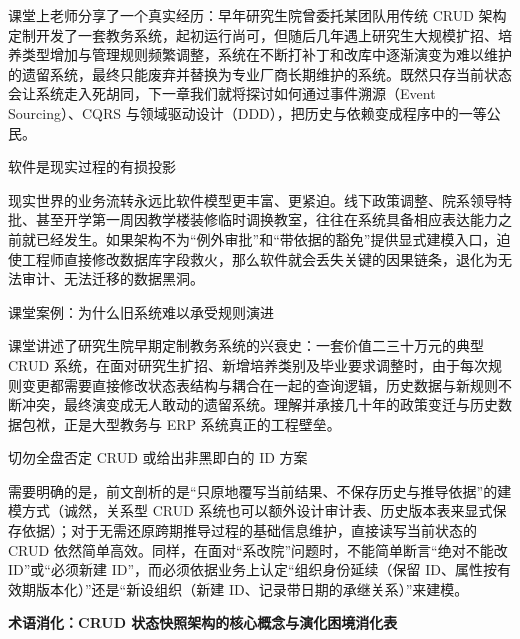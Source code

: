 \documentclass[UTF8,a4paper,11pt,fontset=fandol]{ctexart}
\begin{document}
课堂上老师分享了一个真实经历：早年研究生院曾委托某团队用传统 CRUD 架构定制开发了一套教务系统，起初运行尚可，但随后几年遇上研究生大规模扩招、培养类型增加与管理规则频繁调整，系统在不断打补丁和改库中逐渐演变为难以维护的遗留系统，最终只能废弃并替换为专业厂商长期维护的系统。既然只存当前状态会让系统走入死胡同，下一章我们就将探讨如何通过事件溯源（Event Sourcing）、CQRS 与领域驱动设计（DDD），把历史与依赖变成程序中的一等公民。

\begin{importantbox}{软件是现实过程的有损投影}

现实世界的业务流转永远比软件模型更丰富、更紧迫。线下政策调整、院系领导特批、甚至开学第一周因教学楼装修临时调换教室，往往在系统具备相应表达能力之前就已经发生。如果架构不为“例外审批”和“带依据的豁免”提供显式建模入口，迫使工程师直接修改数据库字段救火，那么软件就会丢失关键的因果链条，退化为无法审计、无法迁移的数据黑洞。

\end{importantbox}

\begin{knowledgebox}{课堂案例：为什么旧系统难以承受规则演进}

课堂讲述了研究生院早期定制教务系统的兴衰史：一套价值二三十万元的典型 CRUD 系统，在面对研究生扩招、新增培养类别及毕业要求调整时，由于每次规则变更都需要直接修改状态表结构与耦合在一起的查询逻辑，历史数据与新规则不断冲突，最终演变成无人敢动的遗留系统。理解并承接几十年的政策变迁与历史数据包袱，正是大型教务与 ERP 系统真正的工程壁垒。

\end{knowledgebox}

\begin{warningbox}{切勿全盘否定 CRUD 或给出非黑即白的 ID 方案}

需要明确的是，前文剖析的是“只原地覆写当前结果、不保存历史与推导依据”的建模方式（诚然，关系型 CRUD 系统也可以额外设计审计表、历史版本表来显式保存依据）；对于无需还原跨期推导过程的基础信息维护，直接读写当前状态的 CRUD 依然简单高效。同样，在面对“系改院”问题时，不能简单断言“绝对不能改 ID”或“必须新建 ID”，而必须依据业务上认定“组织身份延续（保留 ID、属性按有效期版本化）”还是“新设组织（新建 ID、记录带日期的承继关系）”来建模。

\end{warningbox}

\par{}\textbf{术语消化：CRUD 状态快照架构的核心概念与演化困境消化表}
\end{document}
